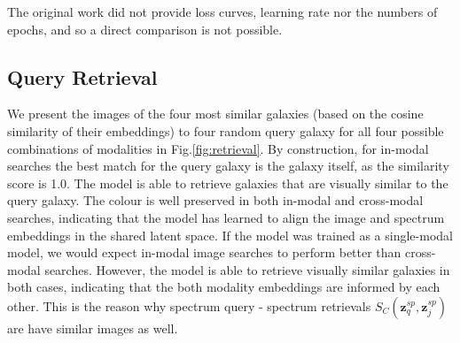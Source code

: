 \documentclass[a4paper,12pt]{article}
\begin{document}
The original work did not provide loss curves, learning rate nor the numbers of epochs, and so a direct comparison is not possible. 




\subsection{Query Retrieval}
We present the images of the four most similar galaxies (based on the cosine similarity of their embeddings) to four random query galaxy for all four possible combinations of modalities in Fig.\ref{fig:retrieval}. By construction, for in-modal searches the best match for the query galaxy is the galaxy itself, as the similarity score is 1.0. The model is able to retrieve galaxies that are visually similar to the query galaxy. The colour is well preserved in both in-modal and cross-modal searches, indicating that the model has learned to align the image and spectrum embeddings in the shared latent space. If the model was trained as a single-modal model, we would expect in-modal image searches to perform better than cross-modal searches. However, the model is able to retrieve visually similar galaxies in both cases, indicating that the both modality embeddings are informed by each other.  This is the reason why spectrum query - spectrum retrievals $S_C(\mathbf{z}^{sp}_q, \mathbf{z}^{sp}_j)$ are have similar images as well. 
\end{document}
